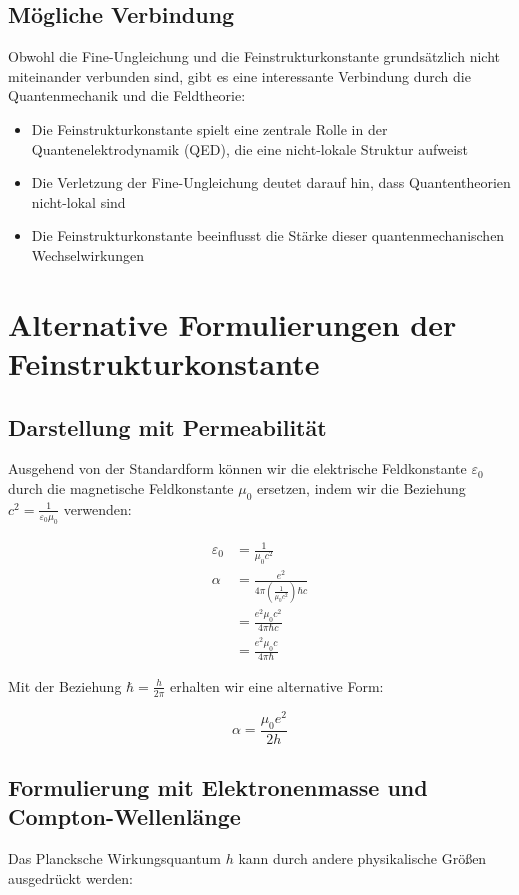 \documentclass{article}
\begin{document}
	\subsection{Mögliche Verbindung}
	Obwohl die Fine-Ungleichung und die Feinstrukturkonstante grundsätzlich nicht miteinander verbunden sind, gibt es eine interessante Verbindung durch die Quantenmechanik und die Feldtheorie:
	
	\begin{itemize}
		\item Die Feinstrukturkonstante spielt eine zentrale Rolle in der Quantenelektrodynamik (QED), die eine nicht-lokale Struktur aufweist
		\item Die Verletzung der Fine-Ungleichung deutet darauf hin, dass Quantentheorien nicht-lokal sind
		\item Die Feinstrukturkonstante beeinflusst die Stärke dieser quantenmechanischen Wechselwirkungen
	\end{itemize}
	
	\section{Alternative Formulierungen der Feinstrukturkonstante}
	
	\subsection{Darstellung mit Permeabilität}
	Ausgehend von der Standardform können wir die elektrische Feldkonstante $\varepsilon_0$ durch die magnetische Feldkonstante $\mu_0$ ersetzen, indem wir die Beziehung $c^2 = \frac{1}{\varepsilon_0\mu_0}$ verwenden:
	
	\begin{align}
		\varepsilon_0 &= \frac{1}{\mu_0c^2}\\
		\alpha &= \frac{e^2}{4\pi\left(\frac{1}{\mu_0c^2}\right)\hbar c}\\
		&= \frac{e^2\mu_0c^2}{4\pi\hbar c}\\
		&= \frac{e^2\mu_0c}{4\pi\hbar}
	\end{align}
	
	Mit der Beziehung $\hbar = \frac{h}{2\pi}$ erhalten wir eine alternative Form:
	
	\begin{equation}
		\alpha = \frac{\mu_0e^2}{2h}
	\end{equation}
	
	\subsection{Formulierung mit Elektronenmasse und Compton-Wellenlänge}
	Das Plancksche Wirkungsquantum $h$ kann durch andere physikalische Größen ausgedrückt werden:
	
\end{document}
